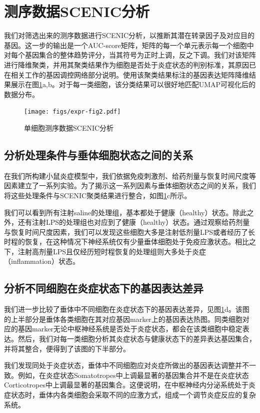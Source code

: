 \section{测序数据SCENIC分析}
  我们对筛选出来的测序数据进行SCENIC分析，以推断其潜在转录因子及对应目的基因。这一步的输出是一个AUC-score矩阵，矩阵的每一个单元表示每一个细胞中对每个基因集合的整体趋势评分，当其符号为正时上调，反之下调。我们对该矩阵进行降维聚类，并用其聚类结果作为细胞是否处于炎症状态的判别标准，其原因已在相关工作的基因调控网络部分说明。使用该聚类结果标注的基因表达矩阵降维结果展示在图\ref{fig:expr-fig2}a,b。对于每一类细胞，该分类结果可以很好地匹配UMAP可视化后的数据分布。

\begin{figure}[!htb]
  \centering
  \texttt{[image: figs/expr-fig2.pdf]}
  \caption{单细胞测序数据SCENIC分析}
  \label{fig:expr-fig2}
\end{figure}

\subsection{分析处理条件与垂体细胞状态之间的关系}
  在我们所构建小鼠炎症模型中，我们依据免疫刺激剂、给药剂量与恢复时间尺度等因素建立了一系列实验。为了揭示这一系列因素与垂体细胞状态之间的关系，我们将这些处理条件与SCENIC聚类结果进行整合，如图\ref{fig:expr-fig2}c所示。

  我们可以看到所有注射saline的处理组，基本都处于健康（healthy）状态。除此之外，还有注射LPS的处理组也对应到了健康（healthy）状态。通过观察给药剂量与恢复时间尺度因素，我们可以发现这些细胞大多是注射低剂量LPS或者经历了长时程的恢复，在这种情况下神经系统仅有少量垂体细胞处于免疫应激状态。相比之下，注射高剂量LPS且仅经历短时程恢复的处理组则大多处于炎症（inflammation）状态。

\subsection{分析不同细胞在炎症状态下的基因表达差异}
  我们进一步比较了垂体中不同细胞在炎症状态下的基因表达差异，见图\ref{fig:expr-fig2}d。该图的上半部分是垂体各类细胞在其对应基因marker上的基因表达热图。同类细胞对应的基因marker无论中枢神经系统是否处于炎症状态，都会在该类细胞中稳定表达。然后，我们对每一类细胞分析其炎症状态与健康状态下的差异表达基因集合，并将其整合，便得到了该图的下半部分。

  我们发现同处于炎症状态，垂体中不同细胞应对炎症所做出的基因表达调整并不一致。例如，在炎症状态Somatotropes中上调最显著的基因集合并不是在炎症状态Corticotropes中上调最显著的基因集合。这便说明，在中枢神经内分泌系统处于炎症状态时，垂体内各类细胞会采取不同的应激方式，组成一个调节炎症反应的复杂系统。

